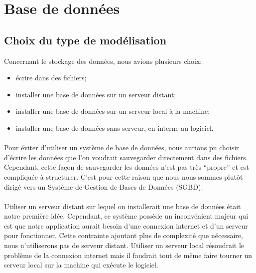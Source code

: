 \section{Base de données}

\subsection{Choix du type de modélisation}

Concernant le stockage des données, nous avions plusieurs choix:

\begin{itemize}
	\item écrire dans des fichiers;
	\item installer une base de données sur un serveur distant;
	\item installer une base de données sur un serveur local à la machine;
	\item installer une base de données sans serveur, en interne au logiciel.
\end{itemize}

\paragraph{}

Pour éviter d’utiliser un système de base de données, nous aurions pu choisir d’écrire les données que l’on voudrait sauvegarder directement dans des fichiers. Cependant, cette façon de sauvegarder les données n’est pas très “propre” et est compliquée à structurer. C’est pour cette raison que nous nous sommes plutôt dirigé vers un Système de Gestion de Bases de Données (SGBD).

\paragraph{}

Utiliser un serveur distant sur lequel on installerait une base de données était notre première idée. Cependant, ce système possède un inconvénient majeur qui est que notre application aurait besoin d’une connexion internet et d’un serveur pour fonctionner. Cette contrainte ajoutant plus de complexité que nécessaire, nous n'utiliserons pas de serveur distant.
Utiliser un serveur local résoudrait le problème de la connexion internet mais il faudrait tout de même faire tourner un serveur local sur la machine qui exécute le logiciel.

\paragraph{}

